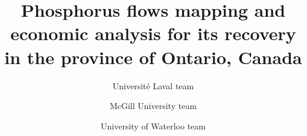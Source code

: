 \documentclass[authoryear]{elsarticle}
\begin{document}
\begin{frontmatter}
	\title{
Phosphorus flows mapping and economic analysis for its recovery in the province of Ontario, Canada
	}
	
	\author[ULaval]{Université Laval team}
	\author[McGill]{McGill University team}
	\author[Waterloo]{University of Waterloo team}
		
	\address[ULaval]{Université Laval}
	\address[McGill]{McGill University}
	\address[Waterloo]{University of Waterloo}
	
	\begin{abstract}
		

\end{abstract}
\end{frontmatter}
\end{document}
